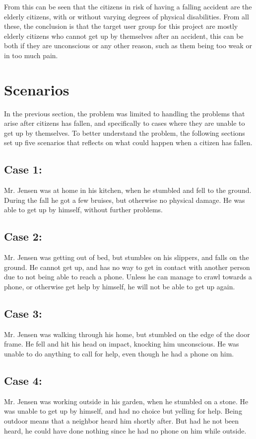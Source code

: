 From this can be seen that the citizens in risk of having a falling accident are the elderly citizens, with or without varying degrees of physical disabilities. From all these, the conclusion is that the target user group for this project are mostly elderly citizens who cannot get up by themselves after an accident, this can be both if they are unconscious or any other reason, such as them being too weak or in too much pain.

\section{Scenarios} \label{preliminaries:problemanalysis:limitproblem}
In the previous section, the problem was limited to handling the problems that arise after citizens has fallen, and specifically to cases where they are unable to get up by themselves. To better understand the problem, the following sections set up five scenarios that reflects on what could happen when a citizen has fallen.

\subsection{Case 1:}
Mr. Jensen was at home in his kitchen, when he stumbled and fell to the ground. During the fall he got a few bruises, but otherwise no physical damage. He was able to get up by himself, without further problems.

\subsection{Case 2:}
Mr. Jensen was getting out of bed, but stumbles on his slippers, and falls on the ground. He cannot get up, and has no way to get in contact with another person due to not being able to reach a phone. Unless he can manage to crawl towards a phone, or otherwise get help by himself, he will not be able to get up again.

\subsection{Case 3:}
Mr. Jensen was walking through his home, but stumbled on the edge of the door frame. He fell and hit his head on impact, knocking him unconscious. He was unable to do anything to call for help, even though he had a phone on him.

\subsection{Case 4:}
Mr. Jensen was working outside in his garden, when he stumbled on a stone. He was unable to get up by himself, and had no choice but yelling for help. Being outdoor means that a neighbor heard him shortly after. But had he not been heard, he could have done nothing since he had no phone on him while outside.

